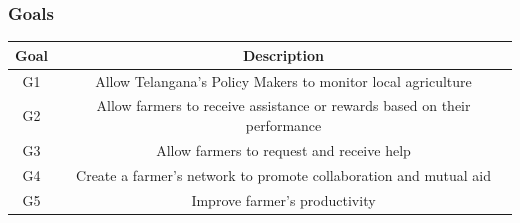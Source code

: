 \documentclass[10pt]{article}
\begin{document}
\subsubsection{Goals}
    \begin{center}
        \vspace{0.5cm}
        \begin{tabular}{|c c|} 
        \hline
        Goal & Description \\ 
        \hline\hline
        G1 & Allow Telangana's Policy Makers to monitor local agriculture\\ 
        \hline
        G2 & Allow farmers to receive assistance or rewards based on their performance\\ 
        \hline
        G3 & Allow farmers to request and receive help \\
        \hline
        G4 & Create a farmer's network to promote collaboration and mutual aid \\ 
        \hline
        G5 & Improve farmer's productivity\\ 
        \hline
        \end{tabular}
    \end{center}
\end{document}
